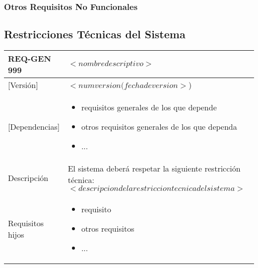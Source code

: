  
\subsubsection{Otros Requisitos No Funcionales}

 

\subsection{Restricciones Técnicas del Sistema}


 \begin{Artefacto}[H]
    \centering
    \begin{tabular}{|p{3cm}|p{10cm}|}
        \hline
         \cellcolor{gray30}  REQ-GEN 999	&  $<nombre descriptivo>$\\ 
        \hline
         \cellcolor{gray30}  [Versión]	&  $<num version(fecha de version>$)\\   
         \hline
         \cellcolor{gray30}  [Dependencias] &  	\begin{itemize} 	\item requisitos generales de los que depende
\item otros requisitos generales de los que dependa
\item	... \end{itemize}\\  
        \hline
         \cellcolor{gray30} Descripción	&El sistema deberá respetar la siguiente restricción técnica: $<descripcion de la restriccion tecnica del sistema>$  \\
          \hline
         \cellcolor{gray30}  Requisitos hijos&  	\begin{itemize} 	\item requisito 
\item otros requisitos 
\item	... \end{itemize}\\  

\end{tabular}
\end{Artefacto}
